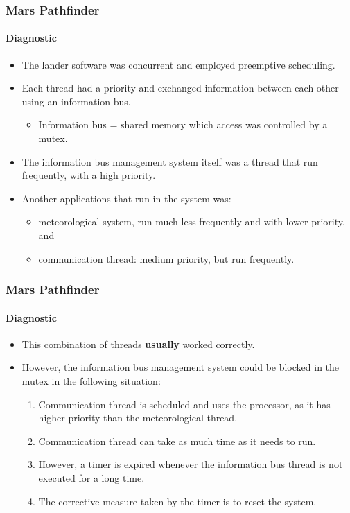 \begin{frame}
\frametitle{Mars Pathfinder}
\framesubtitle{Diagnostic}

\begin{itemize}
	\item The lander software was concurrent and employed preemptive
	scheduling.

	\item Each thread had a priority and exchanged information between each
	other using an information bus.
	\begin{itemize}
		\item Information bus = shared memory which access was controlled
		by a mutex.
	\end{itemize}

	\item The information bus management system itself was a thread that
	run frequently, with a high priority.

	\item Another applications that run in the system was:
	\begin{itemize}
		\item meteorological system, run much less frequently and with lower
		priority, and

		\item communication thread: medium priority, but run frequently.
	\end{itemize}
\end{itemize}
\end{frame}



\begin{frame}
\frametitle{Mars Pathfinder}
\framesubtitle{Diagnostic}

\begin{itemize}
	\item This combination of threads \textbf{usually} worked correctly.

	\item However, the information bus management system could be blocked
	in the mutex in the following situation:
	\begin{enumerate}
		\item Communication thread is scheduled and uses the processor, as
		it has higher priority than the meteorological thread.

		\item Communication thread can take as much time as it needs to
		run.

		\item However, a timer is expired whenever the information bus
		thread is not executed for a long time.

		\item The corrective measure taken by the timer is to reset the
		system.
	\end{enumerate}
\end{itemize}
\end{frame}



